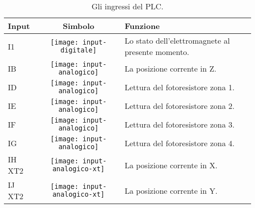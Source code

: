 \begin{table}[htbp]\centering
    \caption{Gli ingressi del PLC.}\label{tab:plc-inputs}
    \begin{tabularx}{\columnwidth}{@{}lcX@{}}\toprule
        \textbf{Input} & \textbf{Simbolo}                                 & \textbf{Funzione}                                 \\ \midrule
        I1             & \texttt{[image: input-digitale]}     & Lo stato dell'elettromagnete al presente momento. \\
        IB             & \texttt{[image: input-analogico]}    & La posizione corrente in Z.                       \\
        ID             & \texttt{[image: input-analogico]}    & Lettura del fotoresistore zona 1.                 \\
        IE             & \texttt{[image: input-analogico]}    & Lettura del fotoresistore zona 2.                 \\
        IF             & \texttt{[image: input-analogico]}    & Lettura del fotoresistore zona 3.                 \\
        IG             & \texttt{[image: input-analogico]}    & Lettura del fotoresistore zona 4.                 \\
        IH XT2         & \texttt{[image: input-analogico-xt]} & La posizione corrente in X.                       \\
        IJ XT2         & \texttt{[image: input-analogico-xt]} & La posizione corrente in Y.                       \\
    \bottomrule\end{tabularx}
\end{table}


